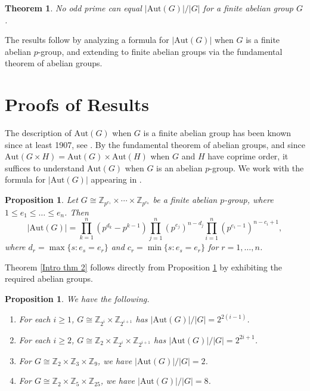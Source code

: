 \documentclass[12pt]{amsart}
\newtheorem{thm}{Theorem}
\newtheorem{proposition}[theorem]{Proposition}
\begin{document}
\begin{thm}\label{Intro thm 3}
No odd prime can equal $ |\mathrm{Aut}(G)|/|G|$ for a finite abelian group $G$.
\end{thm}

The results follow by analyzing a formula for $|\mathrm{Aut}(G)|$ when $G$ is a finite abelian $p$-group, and extending to finite abelian groups via the fundamental theorem of abelian groups.

\section{Proofs of Results}

The description of $\mathrm{Aut}(G)$ when $G$ is a finite abelian group has been known since at least 1907, see \cite{oldaut}.  By the fundamental theorem of abelian groups, and since $\mathrm{Aut}(G \times H) = \mathrm{Aut}(G) \times \mathrm{Aut}(H)$ when $G$ and $H$ have coprime order, it suffices to understand $\mathrm{Aut}(G)$ when $G$ is an abelian $p$-group.  We work with the formula for $|\mathrm{Aut}(G)|$ appearing in \cite{aut}.

\begin{proposition}\label{prop: form}
Let $G \cong \mathbb{Z}_{p^{e_1}} \times \cdots \times \mathbb{Z}_{p^{e_n}}$ be a finite abelian $p$-group, where $1 \leq e_1 \leq \dots \leq e_n$.  Then $$|\mathrm{Aut}(G)| = \prod_{k=1}^{n} (p^{d_k} - p^{k-1}) \prod_{j=1}^{n} (p^{e_j})^{n-d_j} \prod_{i=1}^{n} (p^{e_i-1})^{n-c_i+1},$$ where $d_r = \max\{s: e_s = e_r\}$ and $c_r = \min\{s: e_s = e_r\}$ for $r = 1, \dots, n$.
\end{proposition}

Theorem \ref{Intro thm 2} follows directly from Proposition \ref{prop: form} by exhibiting the required abelian groups.

\begin{proposition}
We have the following.
\begin{enumerate}
\item For each $i \geq 1$, $G \cong \mathbb{Z}_{2^{i}} \times \mathbb{Z}_{2^{i+1}}$ has $|\mathrm{Aut}(G)|/|G| = 2^{2(i-1)}$. 
\item For each $i \geq 2$, $G \cong \mathbb{Z}_{2} \times \mathbb{Z}_{2^{i}} \times \mathbb{Z}_{2^{i+1}}$ has $|\mathrm{Aut}(G)|/|G| = 2^{2i+1}$. 
\item For $G \cong \mathbb{Z}_{2} \times \mathbb{Z}_{3} \times \mathbb{Z}_{9}$, we have $|\mathrm{Aut}(G)|/|G| = 2$. 
\item For $G \cong \mathbb{Z}_{2} \times \mathbb{Z}_{5} \times \mathbb{Z}_{25}$, we have $|\mathrm{Aut}(G)|/|G| = 8$. 
\end{enumerate}
\end{proposition}
\end{document}
